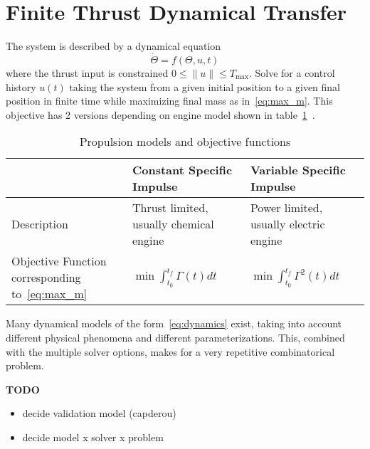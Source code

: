 \section{Finite Thrust Dynamical Transfer}

The system is described by a dynamical equation
\begin{equation} \label{eq:dynamics}
    \dot \Theta = f(\Theta, u, t)
\end{equation}
where the thrust input is constrained \(0 \leq \lVert u \rVert \leq T_{\max}\). Solve for a control history \(u(t)\) taking the system from a given initial position to a given final position in finite time while maximizing final mass as in~\eqref{eq:max_m}. This objective has 2 versions depending on engine model shown in table~\ref{tab:prop_models}~\cite{Conway_2010}.

\begin{table}[]
    \centering
    \begin{tabular}{p{5cm}p{5cm}p{5cm}} \toprule
        & \textbf{Constant Specific Impulse} & \textbf{Variable Specific Impulse} \\ \midrule
        Description & Thrust limited, usually chemical engine & Power limited, usually electric engine \\
        Objective Function corresponding to~\eqref{eq:max_m} & \(\min \int_{t_0}^{t_f} \Gamma(t) dt\) & \(\min \int_{t_0}^{t_f} \Gamma^2(t) dt\) \\ \bottomrule
    \end{tabular}
    \caption{Propulsion models and objective functions}
    \label{tab:prop_models}
\end{table}

Many dynamical models of the form~\eqref{eq:dynamics} exist, taking into account different physical phenomena and different parameterizations. This, combined with the multiple solver options, makes for a very repetitive combinatorical problem. 

\textbf{TODO}
\begin{itemize}
    \item decide validation model (capderou)
    \item decide model x solver x problem
\end{itemize}